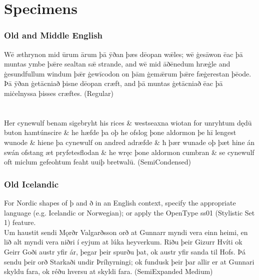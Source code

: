 \documentclass[12pt,letterpaper,openany]{book}
\begin{document}
\hypertarget{specimens}{}\chapter*{\color{RViolet}Specimens}

\subsection*{Old and Middle English}

{\noindent\regular{}Wē æthrynon mid ūrum ārum þā ȳðan þæs dēopan wǣles; wē
ġesāwon ēac þā muntas ymbe þǣre sealtan sǣ strande, and wē mid
āðēnedum hræġle and ġesundfullum windum þǣr ġewīcodon on þām
ġemǣrum þǣre fæġerestan þēode. Þā ȳðan ġetācniað þisne dēopan
cræft, and þā muntas ġetācniað ēac þā miċelnyssa þisses cræftes. (Regular)}\\

\\

\\[1ex]
{\seminarrow{}
Her cynewulf benam sigebryht his rices \& westseaxna wiotan for
un\-ryht\-um dędū buton hamtúnscire \& he hæfde þa oþ he ofslog
þone aldormon þe hī lengest wunode \& hiene þa cynewulf on
andred adræfde \& ħ þær wunade oþ þæt hine án swán ofstang
æt pryfetesflodan \& he wręc þone aldormon cumbran \& se cynewulf
oft miclum gefeohtum feaht uuiþ bretwalū.} (SemiCondensed)

\subsection*{Old Icelandic}
{\small\semiconditalic{} For Nordic shapes of þ and ð in an
English context, specify the appropriate language (e.g. Icelandic or Norwegian);
or apply the OpenType ss01 (Stylistic Set 1) feature.}\\[1ex]
{\medium Um haustit sendi Mǫrðr Valgarðsson orð at Gunnarr myndi vera einn heimi, en
lið alt myndi vera niðri í eyjum at lúka heyverkum. Riðu þeir Gizurr Hvíti ok
Geirr Goði austr yfir ár, þegar þeir spurðu þat, ok austr yfir sanda til Hofs.
Þá sendu þeir orð Starkaði undir Þríhyrningi; ok fundusk þeir þar allir er at
Gunnari skyldu fara, ok réðu hversu at skyldi fara.} (SemiExpanded Medium)
\end{document}
